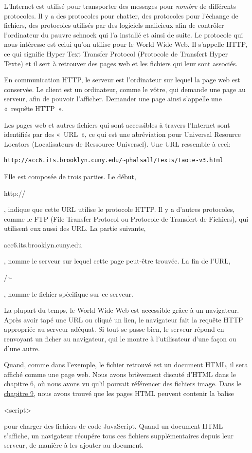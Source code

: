 \documentclass{FramateX}
\renewcommand{\texttt}[1]{\begin{sffamily}{#1}\end{sffamily}}
\begin{document}
L'Internet est utilisé pour transporter des messages pour \emph{nombre}
de différents protocoles. Il y a des protocoles pour chatter, des
protocoles pour l'échange de fichiers, des protocoles utilisés par des
logiciels malicieux afin de contrôler l'ordinateur du pauvre schnock qui
l'a installé et ainsi de suite. Le protocole qui nous intéresse est
celui qu'on utilise pour le World Wide Web. Il s'appelle HTTP, ce qui
signifie Hyper Text Transfer Protocol (Protocole de Transfert Hyper
Texte) et il sert à retrouver des pages web et les fichiers qui leur
sont associés.

En communication HTTP, le serveur est l'ordinateur sur lequel la page
web est conservée. Le client est un ordinateur, comme le vôtre, qui
demande une page au serveur, afin de pouvoir l'afficher. Demander une
page ainsi s'appelle une «~requête HTTP~».

\begin{center}\end{center}

Les pages web et autres fichiers qui sont accessibles à travers
l'Internet sont identifiés par des «~URL~», ce qui est une abréviation
pour Universal Resource Locators (Localisateurs de Ressource Universel).
Une URL ressemble à ceci:

\begin{lstlisting}
http://acc6.its.brooklyn.cuny.edu/~phalsall/texts/taote-v3.html
\end{lstlisting}
Elle est composée de trois parties. Le début, \texttt{http://}, indique
que cette URL utilise le protocole HTTP. Il y a d'autres protocoles,
comme le FTP (File Transfer Protocol ou Protocole de Transfert de
Fichiers), qui utilisent eux aussi des URL. La partie suivante,
\texttt{acc6.its.brooklyn.cuny.edu}, nomme le serveur sur lequel cette
page peut-être trouvée. La fin de l'URL, \texttt{/\ensuremath{\sim}},
nomme le fichier spécifique sur ce serveur.

La plupart du temps, le World Wide Web est accessible grâce à un
navigateur. Après avoir tapé une URL ou cliqué un lien, le navigateur
fait la requête HTTP appropriée au serveur adéquat. Si tout se passe
bien, le serveur répond en renvoyant un ficher au navigateur, qui le
montre à l'utilisateur d'une façon ou d'une autre.

Quand, comme dans l'exemple, le fichier retrouvé est un document HTML,
il sera affiché comme une page web. Nous avons brièvement discuté d'HTML
dans le \href{chapter6.html}{chapitre 6}, où nous avons vu qu'il pouvait
référencer des fichiers image. Dans le \href{chapter9.html}{chapitre 9},
nous avons trouvé que les pages HTML peuvent contenir la balise
\texttt{\textless{}script\textgreater{}} pour charger des fichiers de
code JavaScript. Quand un document HTML s'affiche, un navigateur
récupére tous ces fichiers supplémentaires depuis leur serveur, de
manière à les ajouter au document.
\end{document}
